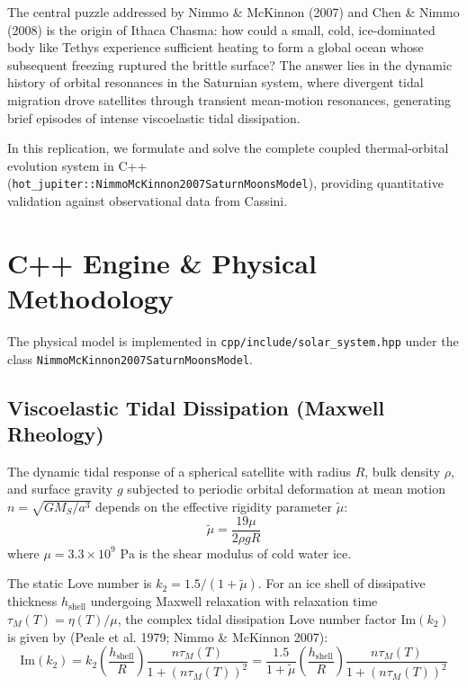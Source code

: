 \documentclass[11pt,a4paper]{article}
\begin{document}
The central puzzle addressed by Nimmo \& McKinnon (2007) and Chen \& Nimmo (2008) is the origin of Ithaca Chasma: how could a small, cold, ice-dominated body like Tethys experience sufficient heating to form a global ocean whose subsequent freezing ruptured the brittle surface? The answer lies in the dynamic history of orbital resonances in the Saturnian system, where divergent tidal migration drove satellites through transient mean-motion resonances, generating brief episodes of intense viscoelastic tidal dissipation.

In this replication, we formulate and solve the complete coupled thermal-orbital evolution system in C++ (\texttt{hot\_jupiter::NimmoMcKinnon2007SaturnMoonsModel}), providing quantitative validation against observational data from Cassini.

\section{C++ Engine \& Physical Methodology}
The physical model is implemented in \texttt{cpp/include/solar\_system.hpp} under the class \texttt{NimmoMcKinnon2007SaturnMoonsModel}.

\subsection{Viscoelastic Tidal Dissipation (Maxwell Rheology)}
The dynamic tidal response of a spherical satellite with radius $R$, bulk density $\rho$, and surface gravity $g$ subjected to periodic orbital deformation at mean motion $n = \sqrt{G M_S / a^3}$ depends on the effective rigidity parameter $\tilde{\mu}$:
\begin{equation}
\tilde{\mu} = \frac{19 \mu}{2 \rho g R}
\end{equation}
where $\mu = 3.3 \times 10^9\text{ Pa}$ is the shear modulus of cold water ice.

The static Love number is $k_2 = 1.5 / (1 + \tilde{\mu})$. For an ice shell of dissipative thickness $h_{\text{shell}}$ undergoing Maxwell relaxation with relaxation time $\tau_M(T) = \eta(T) / \mu$, the complex tidal dissipation Love number factor $\mathrm{Im}(k_2)$ is given by (Peale et al. 1979; Nimmo \& McKinnon 2007):
\begin{equation}
\mathrm{Im}(k_2) = k_2 \left(\frac{h_{\text{shell}}}{R}\right) \frac{n \tau_M(T)}{1 + (n \tau_M(T))^2} = \frac{1.5}{1 + \tilde{\mu}} \left(\frac{h_{\text{shell}}}{R}\right) \frac{n \tau_M(T)}{1 + (n \tau_M(T))^2}
\end{equation}
\end{document}
